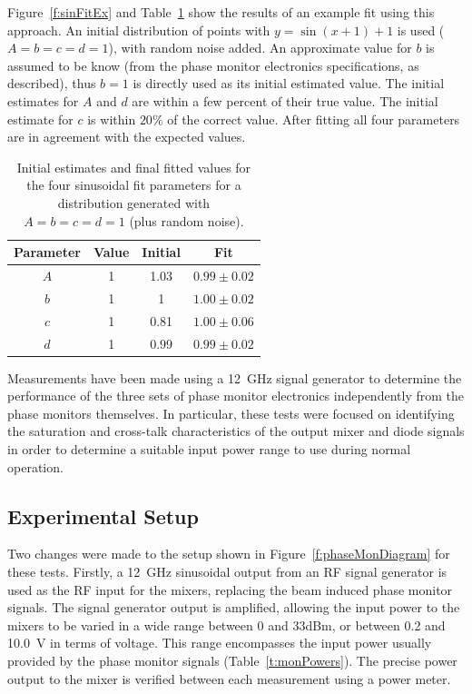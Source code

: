 Figure~\ref{f:sinFitEx} and Table~\ref{t:sinFitEx} show the results of an example fit using this approach. An initial distribution of points with \(y=\sin(x+1)+1\) is used (\(A = b = c = d = 1\)), with random noise added. An approximate value for \(b\) is assumed to be know (from the phase monitor electronics specifications, as described), thus \(b=1\) is directly used as its initial estimated value. The initial estimates for \(A\) and \(d\) are within a few percent of their true value. The initial estimate for \(c\) is within \(20\%\) of the correct value. After fitting all four parameters are in agreement with the expected values.

\begin{table}
  \begin{center}
    \begin{tabular}{|c c c c|}
	   \hline
       Parameter & Value & Initial & Fit \\ \hline
       \(A\) & 1 & 1.03 & \(0.99\pm0.02\)\\
       \(b\) & 1 & 1 & \(1.00\pm0.02\) \\
       \(c\) & 1 & 0.81 & \(1.00\pm0.06\) \\
       \(d\) & 1 & 0.99 & \(0.99\pm0.02\) \\ \hline
    \end{tabular}
    \caption{Initial estimates and final fitted values for the four sinusoidal fit parameters for a distribution generated with \(A = b = c = d = 1\) (plus random noise).}
  	\label{t:sinFitEx}
  \end{center}
\end{table}


Measurements have been made using a 12~GHz signal generator to determine the performance of the three sets of phase monitor electronics independently from the phase monitors themselves. In particular, these tests were focused on identifying the saturation and cross-talk characteristics of the output mixer and diode signals in order to determine a suitable input power range to use during normal operation.

\subsection{Experimental Setup}
\label{ss:sigGenSetup}

Two changes were made to the setup shown in Figure~\ref{f:phaseMonDiagram} for these tests. 
Firstly, a 12~GHz sinusoidal output from an RF signal generator is used as the RF input for the mixers, replacing the beam induced phase monitor signals.
The signal generator output is amplified, allowing the input power to the mixers to be varied in a wide range between 0 and 33dBm, or between 0.2 and 10.0~V in terms of voltage. This range encompasses the input power usually provided by the phase monitor signals (Table~\ref{t:monPowers}). The precise power output to the mixer is verified between each measurement using a power meter. 

